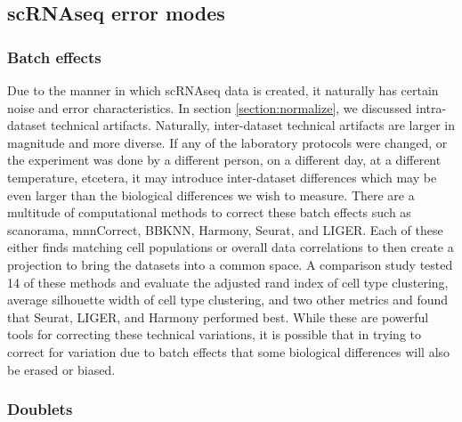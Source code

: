 \subsection{scRNAseq error modes}\label{section:scerrors}

\subsubsection{Batch effects}

\par{
Due to the manner in which scRNAseq data is created, it naturally has certain noise and error characteristics. In section \ref{section:normalize}, we discussed intra-dataset technical artifacts. Naturally, inter-dataset technical artifacts are larger in magnitude and more diverse. If any of the laboratory protocols were changed, or the experiment was done by a different person, on a different day, at a different temperature, etcetera, it may introduce inter-dataset differences which may be even larger than the biological differences we wish to measure. There are a multitude of computational methods to correct these batch effects such as scanorama\cite{scanorama}, mnnCorrect\cite{batch1}, BBKNN\cite{BBKNN}, Harmony\cite{harmony}, Seurat\cite{seurat3}, and LIGER\cite{LIGER}. Each of these either finds matching cell populations or overall data correlations to then create a projection to bring the datasets into a common space. A comparison study tested 14 of these methods and evaluate the adjusted rand index of cell type clustering, average silhouette width of cell type clustering, and two other metrics and found that Seurat, LIGER, and Harmony performed best. While these are powerful tools for correcting these technical variations, it is possible that in trying to correct for variation due to batch effects that some biological differences will also be erased or biased.
}

\subsubsection{Doublets}

